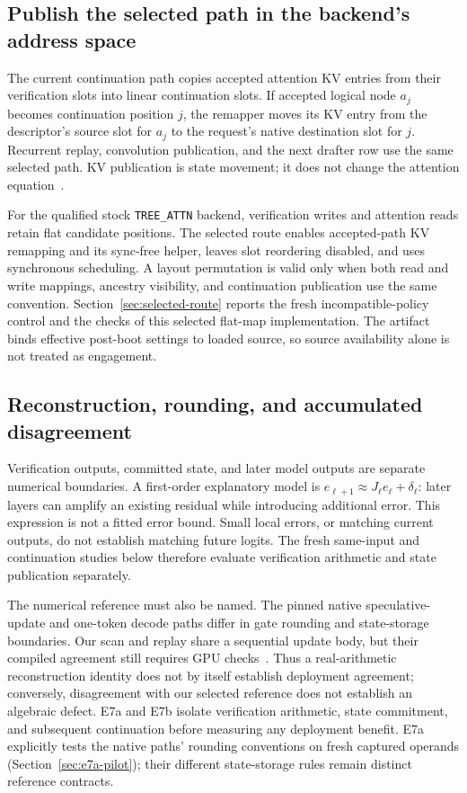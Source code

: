 \documentclass[conference]{IEEEtran}
\begin{document}
\subsection{Publish the selected path in the backend's address space}
The current continuation path copies accepted attention KV entries from their verification slots into linear continuation slots. If accepted logical node $a_j$ becomes continuation position $j$, the remapper moves its KV entry from the descriptor's source slot for $a_j$ to the request's native destination slot for $j$. Recurrent replay, convolution publication, and the next drafter row use the same selected path. KV publication is state movement; it does not change the attention equation~\cite{lumo2026archive}.

For the qualified stock \texttt{TREE\_ATTN} backend, verification writes and attention reads retain flat candidate positions. The selected route enables accepted-path KV remapping and its sync-free helper, leaves slot reordering disabled, and uses synchronous scheduling. A layout permutation is valid only when both read and write mappings, ancestry visibility, and continuation publication use the same convention. Section~\ref{sec:selected-route} reports the fresh incompatible-policy control and the checks of this selected flat-map implementation. The artifact binds effective post-boot settings to loaded source, so source availability alone is not treated as engagement.

\subsection{Reconstruction, rounding, and accumulated disagreement}
\label{sec:reconstruction-numerics}
Verification outputs, committed state, and later model outputs are separate numerical boundaries. A first-order explanatory model is $e_{\ell+1}\approx J_\ell e_\ell+\delta_\ell$: later layers can amplify an existing residual while introducing additional error. This expression is not a fitted error bound. Small local errors, or matching current outputs, do not establish matching future logits. The fresh same-input and continuation studies below therefore evaluate verification arithmetic and state publication separately.

The numerical reference must also be named. The pinned native speculative-update and one-token decode paths differ in gate rounding and state-storage boundaries. Our scan and replay share a sequential update body, but their compiled agreement still requires GPU checks~\cite{lumo2026archive}. Thus a real-arithmetic reconstruction identity does not by itself establish deployment agreement; conversely, disagreement with our selected reference does not establish an algebraic defect. E7a and E7b isolate verification arithmetic, state commitment, and subsequent continuation before measuring any deployment benefit. E7a explicitly tests the native paths' rounding conventions on fresh captured operands (Section~\ref{sec:e7a-pilot}); their different state-storage rules remain distinct reference contracts.
\end{document}
